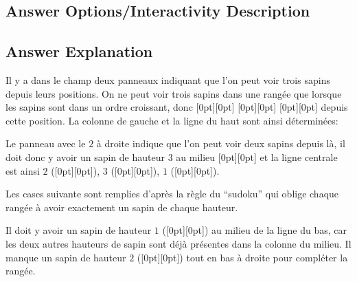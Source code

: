 \documentclass[a4paper,11pt]{report}
\newcommand{\taskGraphicsFolder}{..}
\begin{document}
\subsection*{Answer Options/Interactivity Description}



\endgroup

\subsection*{Answer Explanation}

Il y a dans le champ deux panneaux indiquant que l’on peut voir trois sapins depuis leurs positions. On ne peut voir trois sapins dans une rangée que lorsque les sapins sont dans un ordre croissant, donc \raisebox{-0.5ex}[0pt][0pt]{} \raisebox{-0.5ex}[0pt][0pt]{} \raisebox{-0.5ex}[0pt][0pt]{} depuis cette position. La colonne de gauche et la ligne du haut sont ainsi déterminées:

{\centering%
\par}

Le panneau avec le $2$ à droite indique que l’on peut voir deux sapins depuis là, il doit donc y avoir un sapin de hauteur $3$ au milieu \raisebox{-0.5ex}[0pt][0pt]{} et la ligne centrale est ainsi $2$ (\raisebox{-0.5ex}[0pt][0pt]{}), $3$ (\raisebox{-0.5ex}[0pt][0pt]{}), $1$ (\raisebox{-0.5ex}[0pt][0pt]{}).

Les cases suivante sont remplies d’après la règle du “sudoku” qui oblige chaque rangée à avoir exactement un sapin de chaque hauteur.

Il doit y avoir un sapin de hauteur $1$ (\raisebox{-0.5ex}[0pt][0pt]{}) au milieu de la ligne du bas, car les deux autres hauteurs de sapin sont déjà présentes dans la colonne du milieu. Il manque un sapin de hauteur $2$ (\raisebox{-0.5ex}[0pt][0pt]{}) tout en bas à droite pour compléter la rangée.
\end{document}
